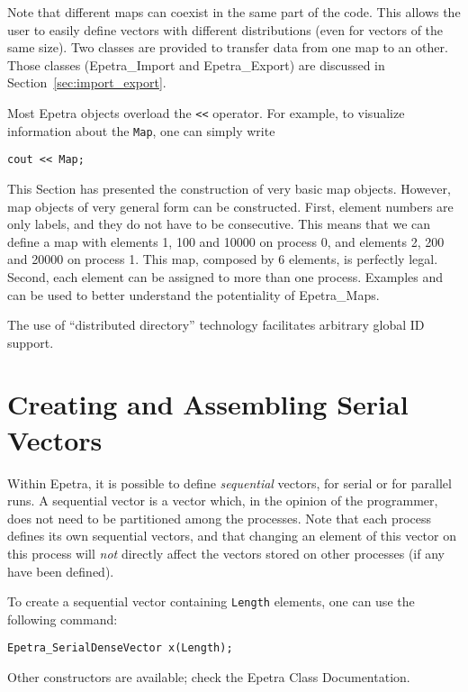 \smallskip

Note that different maps can coexist in the same part of the code. This
allows the user to easily define vectors with different distributions
(even for vectors of the same size).  Two classes are provided to
transfer data from one map to an other. Those classes (Epetra\_Import
and Epetra\_Export) are discussed in Section~\ref{sec:import_export}.

\begin{remark}
Most Epetra objects overload the \verb!<<! operator. For example, to
visualize information about the \verb!Map!, one can simply write
\begin{verbatim}
cout << Map;
\end{verbatim}
\end{remark}

This Section has presented the construction of very basic map objects.
However, map objects of very general form can be constructed. First,
element numbers are only labels, and they do not have to be consecutive.
This means that we can define a map with elements 1, 100 and 10000 on
process 0, and elements 2, 200 and 20000 on process 1. This map,
composed by 6 elements, is perfectly legal. Second, each element can be
assigned to more than one process. Examples  and
 can be used to better understand the potentiality
of Epetra\_Maps.

\begin{remark}
  The use of ``distributed directory'' technology facilitates arbitrary
  global ID support.
\end{remark}


\section{Creating and Assembling Serial Vectors}
\label{sec:serial_vec}

Within Epetra, it is possible to define {\em sequential} vectors, for
serial or for parallel runs. A sequential vector is a vector which, in
the opinion of the programmer, does not need to be partitioned among the
processes.  Note that each process defines its own sequential vectors,
and that changing an element of this vector on this process will {\em
  not} directly affect the vectors stored on other processes (if any
have been defined).

To create a sequential vector containing {\tt Length} elements, one can
use the following command:
\begin{verbatim}
Epetra_SerialDenseVector x(Length);
\end{verbatim}
Other constructors are available; check the Epetra Class
Documentation.

